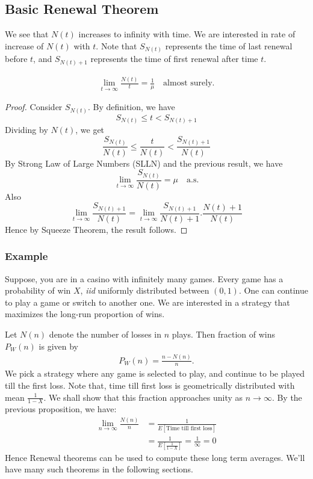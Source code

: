\documentclass[a4paper,10pt, english]{article}
\begin{document}
\subsection{Basic Renewal Theorem}
We see that $N(t)$ increases to infinity with time. We are interested in rate of increase of $N(t)$ with $t$. Note that $S_{N(t)}$ represents the time of last renewal before $t$, and $S_{N(t)+1}$ represents the time of first renewal after time $t$. 
\begin{prop}
\begin{align*}
\lim_{t \to \infty} \frac{N(t)}{t} = \frac{1}{\mu} \quad \mbox{almost surely}.
\end{align*}
\end{prop}
\begin{proof}

Consider $S_{N(t)}$. By definition, we have
\[S_{N(t)} \leq t < S_{N(t)+1}\]
Dividing by $N(t)$, we get 
\[\frac{S_{N(t)}}{N(t)} \leq \frac{t}{N(t)} < \frac{S_{N(t)+1}}{N(t)}\]
By Strong Law of Large Numbers (SLLN) and the previous result, we have
\[\lim_{t \to \infty}\frac{S_{N(t)}}{N(t)} = \mu \quad \mbox{a.s.}\] 
Also
\[\lim_{t \to \infty} \frac{S_{N(t)+1}}{N(t)} = \lim_{t \to \infty} \frac{S_{N(t)+1}}{N(t)+1}.\frac{N(t)+1}{N(t)} \]
Hence by Squeeze Theorem, the result follows.
\end{proof}
\subsubsection{Example}
Suppose, you are in a casino with infinitely many games. Every game has a probability of win $X$, \emph{iid} uniformly distributed between $(0,1)$. One can continue to play a game or switch to another one. We are interested in a strategy that maximizes the long-run proportion of wins.

Let $N(n)$ denote the number of losses in $n$ plays. Then fraction of wins $P_W(n)$ is given by 
\begin{align*}
P_W(n) = \frac{n-N(n)}{n}.
\end{align*}
We pick a strategy where any game is selected to play, and continue to be played till the first loss. Note that, time till first loss is geometrically distributed with mean $\frac{1}{1-X}$. We shall show that this fraction approaches unity as $n \to \infty$. By the previous proposition, we have:
\begin{align*}
\lim_{n \to \infty} \frac{N(n)}{n} &= \frac{1}{E[\mbox{Time till first loss}]} \\
&= \frac{1}{E\left[\frac{1}{1-X}\right]} = \frac{1}{\infty} = 0
\end{align*}
Hence Renewal theorems can be used to compute these long term averages. We'll have many such theorems in the following sections.
\end{document}
